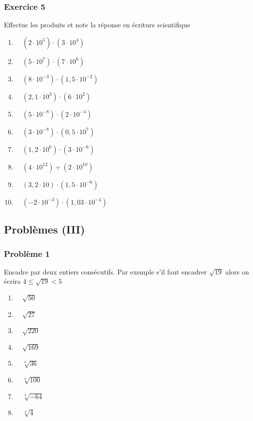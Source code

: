 \documentclass[
  12pt,
]{book}
\providecommand{\tightlist}{%
  \setlength{\itemsep}{0pt}\setlength{\parskip}{0pt}}
\begin{document}
\hypertarget{exercice-5-1}{%
\subsubsection*{Exercice 5}\label{exercice-5-1}}

Effectue les produits et note la réponse en écriture scientifique

\begin{enumerate}
\def\labelenumi{\arabic{enumi}.}
\tightlist
\item
  \(\quad (2\cdot 10^5)\cdot(3\cdot 10^4)\)
\item
  \(\quad (5\cdot 10^7)\cdot(7\cdot 10^6)\)
\item
  \(\quad (8\cdot 10^{-3})\cdot(1{,}5\cdot 10^{-2})\)
\item
  \(\quad (2{,}1\cdot 10^3)\cdot(6\cdot 10^2)\)
\item
  \(\quad (5\cdot 10^{-8})\cdot (2\cdot 10^{-4})\)
\item
  \(\quad (3\cdot 10^{-8})\cdot(0{,}5\cdot 10^7)\)
\item
  \(\quad (1{,}2\cdot 10^6)\cdot(3\cdot 10^{-6})\)
\item
  \(\quad (4\cdot 10^12)\div(2\cdot 10^{10})\)
\item
  \(\quad (3{,}2\cdot 10)\cdot(1{,}5\cdot 10^{-6})\)
\item
  \(\quad (-2\cdot 10^{-3})\cdot(1{,}03\cdot 10^{-4})\)
\end{enumerate}

\hypertarget{probluxe8mes-iii}{%
\subsection{Problèmes (III)}\label{probluxe8mes-iii}}

\hypertarget{probluxe8me-1}{%
\subsubsection*{Problème 1}\label{probluxe8me-1}}

Encadre par deux entiers consécutifs. Par exemple s'il faut encadrer \(\sqrt{19}\) alors on écrira \(4\leq \sqrt{19} < 5\)

\begin{enumerate}
\def\labelenumi{\arabic{enumi}.}
\tightlist
\item
  \(\quad \sqrt{50}\)
\item
  \(\quad \sqrt{27}\)
\item
  \(\quad \sqrt{220}\)
\item
  \(\quad \sqrt{169}\)
\item
  \(\quad \sqrt[3]{36}\)
\item
  \(\quad \sqrt[3]{100}\)
\item
  \(\quad \sqrt[3]{-64}\)
\item
  \(\quad \sqrt[4]{4}\)
\end{enumerate}
\end{document}
